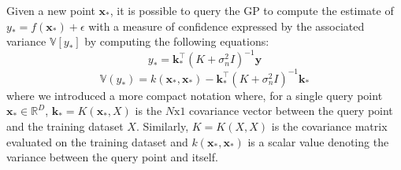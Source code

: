 Given a new point $\mathbf{x}_*$, it is possible to query the GP to compute the estimate of $y_*=f(\mathbf{x}_*)+\epsilon$ with a measure of confidence expressed by the associated variance $\mathbb{V}[y_*]$ by computing the following equations:
$$
y_*=\mathbf{k}_*^\top(K+\sigma_n^2I)^{-1}\mathbf{y}
$$
$$
\mathbb{V}(y_*)=k(\mathbf{x}_*,\mathbf{x}_*)-\mathbf{k}_*^\top(K+\sigma_n^2I)^{-1}\mathbf{k}_*
$$
where we introduced a more compact notation where, for a single query point $\mathbf{x}_*\in\mathbb{R}^D$, $\mathbf{k}_*=K(\mathbf{x}_*,X)$ is the $N\text{x}1$ covariance vector between the query point and the training dataset $X$. Similarly, $K=K(X,X)$ is the covariance matrix evaluated on the training dataset and $k(\mathbf{x}_*,\mathbf{x}_*)$ is a scalar value denoting the variance between the query point and itself.


























